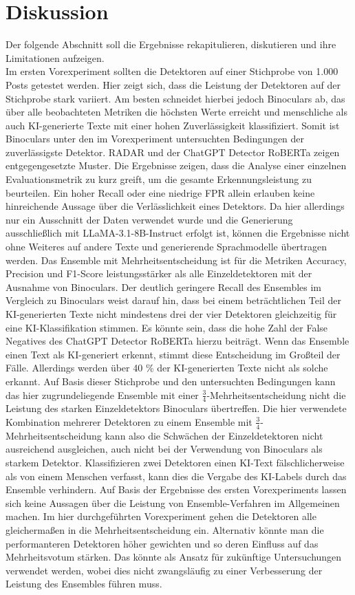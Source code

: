 \chapter{Diskussion}
\label{chap:discussion}
Der folgende Abschnitt soll die Ergebnisse rekapitulieren, diskutieren und ihre Limitationen aufzeigen. \\
Im ersten Vorexperiment sollten die Detektoren auf einer Stichprobe von 1.000 Posts getestet werden. Hier zeigt sich, dass die Leistung der Detektoren auf der Stichprobe stark variiert. Am besten schneidet hierbei jedoch Binoculars ab, das über alle beobachteten Metriken die höchsten Werte erreicht und menschliche als auch KI-generierte Texte mit einer hohen Zuverlässigkeit klassifiziert. Somit ist Binoculars unter den im Vorexperiment untersuchten Bedingungen der zuverlässigste Detektor. RADAR und der ChatGPT Detector RoBERTa zeigen entgegengesetzte Muster. Die Ergebnisse zeigen, dass die Analyse einer einzelnen Evaluationsmetrik zu kurz greift, um die gesamte Erkennungsleistung zu beurteilen. Ein hoher Recall oder eine niedrige FPR allein erlauben keine hinreichende Aussage über die Verlässlichkeit eines Detektors. Da hier allerdings nur ein Ausschnitt der Daten verwendet wurde und die Generierung ausschließlich mit LLaMA-3.1-8B-Instruct erfolgt ist, können die Ergebnisse nicht ohne Weiteres auf andere Texte und generierende Sprachmodelle übertragen werden.
Das Ensemble mit Mehrheitsentscheidung ist für die Metriken Accuracy, Precision und F1-Score leistungsstärker als alle Einzeldetektoren mit der Ausnahme von Binoculars.
Der deutlich geringere Recall des Ensembles im Vergleich zu Binoculars weist darauf hin, dass bei einem beträchtlichen Teil der KI-generierten Texte nicht mindestens drei der vier Detektoren gleichzeitig für eine KI-Klassifikation stimmen. Es könnte sein, dass die hohe Zahl der False Negatives des ChatGPT Detector RoBERTa hierzu beiträgt. Wenn das Ensemble einen Text als KI-generiert erkennt, stimmt diese Entscheidung im Großteil der Fälle. Allerdings werden über 40 \% der KI-generierten Texte nicht als solche erkannt. Auf Basis dieser Stichprobe und den untersuchten Bedingungen kann das hier zugrundeliegende Ensemble mit einer \(\frac{3}{4}\)-Mehrheitsentscheidung nicht die Leistung des starken Einzeldetektors Binoculars übertreffen. Die hier verwendete Kombination mehrerer Detektoren zu einem Ensemble mit \(\frac{3}{4}\)-Mehrheitsentscheidung kann also die Schwächen der Einzeldetektoren nicht ausreichend ausgleichen, auch nicht bei der Verwendung von Binoculars als starkem Detektor. Klassifizieren zwei Detektoren einen KI-Text fälschlicherweise als von einem Menschen verfasst, kann dies die Vergabe des KI-Labels durch das Ensemble verhindern. Auf Basis der Ergebnisse des ersten Vorexperiments lassen sich keine Aussagen über die Leistung von Ensemble-Verfahren im Allgemeinen machen. Im hier durchgeführten Vorexperiment gehen die Detektoren alle gleichermaßen in die Mehrheitsentscheidung ein. Alternativ könnte man die performanteren Detektoren höher gewichten und so deren Einfluss auf das Mehrheitsvotum stärken. Das könnte als Ansatz für zukünftige Untersuchungen verwendet werden, wobei dies nicht zwangsläufig zu einer Verbesserung der Leistung des Ensembles führen muss.
